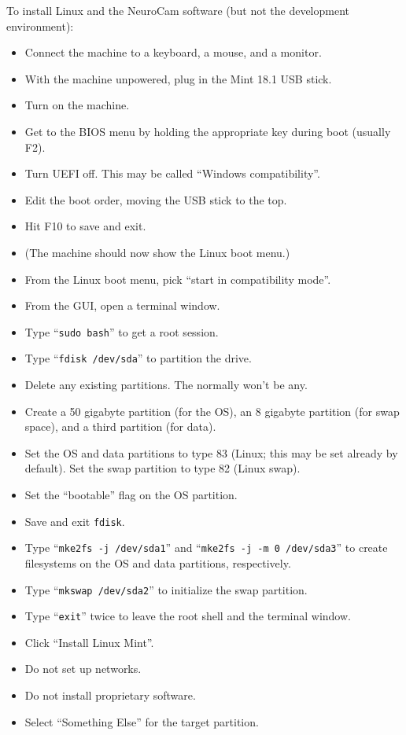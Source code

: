 To install Linux and the NeuroCam software (but not the development
environment):
\begin{itemize}
%
\item Connect the machine to a keyboard, a mouse, and a monitor.
\item With the machine unpowered, plug in the Mint 18.1 USB stick.
\item Turn on the machine.
\item Get to the BIOS menu by holding the appropriate key during boot
(usually F2).
\item Turn UEFI off. This may be called ``Windows compatibility''.
\item Edit the boot order, moving the USB stick to the top.
\item Hit F10 to save and exit.
%
\item (The machine should now show the Linux boot menu.)
\item From the Linux boot menu, pick ``start in compatibility mode''.
\item From the GUI, open a terminal window.
\item Type ``\verb+sudo bash+'' to get a root session.
\item Type ``\verb+fdisk /dev/sda+'' to partition the drive.
\item Delete any existing partitions. The normally won't be any.
\item Create a 50 gigabyte partition (for the OS), an 8 gigabyte partition
(for swap space), and a third partition (for data).
\item Set the OS and data partitions to type 83 (Linux; this may be set
already by default). Set the swap partition to type 82 (Linux swap).
\item Set the ``bootable'' flag on the OS partition.
\item Save and exit \verb+fdisk+.
\item Type ``\verb+mke2fs -j /dev/sda1+'' and
``\verb+mke2fs -j -m 0 /dev/sda3+'' to create filesystems on the OS and
data partitions, respectively.
\item Type ``\verb+mkswap /dev/sda2+'' to initialize the swap partition.
\item Type ``\verb+exit+'' twice to leave the root shell and the terminal
window.
%
\item Click ``Install Linux Mint''.
\item Do not set up networks.
\item Do not install proprietary software.
\item Select ``Something Else'' for the target partition.

\end{itemize}

